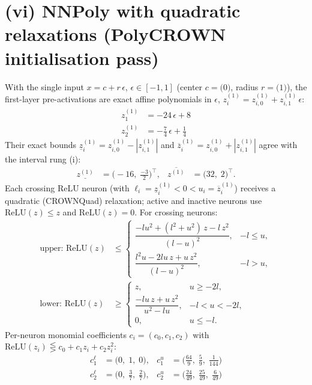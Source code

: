 \documentclass[11pt]{article}
\begin{document}
\section{(vi) NNPoly with quadratic relaxations (PolyCROWN initialisation pass)}
With the single input $x = c + r\,\epsilon$, $\epsilon \in [-1, 1]$ (center $c = \bigl(0\bigr)$, radius $r = \bigl(1\bigr)$), the first-layer pre-activations are exact affine polynomials in $\epsilon$, $z^{(1)}_i = z^{(1)}_{i,0} + z^{(1)}_{i,1}\,\epsilon$:
\begin{align*}
z^{(1)}_{1} &= -24\,\epsilon + 8 \\
z^{(1)}_{2} &= -\frac{7}{4}\,\epsilon + \frac{1}{4}
\end{align*}
Their exact bounds $\underline{z}^{(1)}_i = z^{(1)}_{i,0} - |z^{(1)}_{i,1}|$ and $\overline{z}^{(1)}_i = z^{(1)}_{i,0} + |z^{(1)}_{i,1}|$ agree with the interval rung (i):
\begin{align*}
\underline{z^{(1)}} &= \bigl(-16,\; \frac{-3}{2}\bigr)^{\!\top}, & \overline{z^{(1)}} &= \bigl(32,\; 2\bigr)^{\!\top}.
\end{align*}
Each crossing ReLU neuron (with $\ell_i = \underline{z}^{(1)}_i < 0 < u_i = \overline{z}^{(1)}_i$)
receives a quadratic (CROWNQuad) relaxation; active and inactive neurons use $\mathrm{ReLU}(z) \le z$
and $\mathrm{ReLU}(z) = 0$. For crossing neurons:
\begin{align*}
\text{upper: } \mathrm{ReLU}(z) &\le \begin{cases} \dfrac{-l u^2 + (l^2 + u^2)\, z - l\, z^2}{(l - u)^2}, & -l \le u, \\[3mm] \dfrac{l^2 u - 2 l u\, z + u\, z^2}{(l - u)^2}, & -l > u, \end{cases} \\[2mm]
\text{lower: } \mathrm{ReLU}(z) &\ge \begin{cases} z, & u \ge -2l, \\[3mm] \dfrac{-l u\, z + u\, z^2}{u^2 - l u}, & -l < u < -2l, \\[3mm] 0, & u \le -l. \end{cases}
\end{align*}
Per-neuron monomial coefficients $c_i = (c_0, c_1, c_2)$ with $\mathrm{ReLU}(z_i) \lesseqgtr c_0 + c_1 z_i + c_2 z_i^2$:
\begin{align*}
c^{\ell}_{1} &= \bigl(0,\; 1,\; 0\bigr), & c^{u}_{1} &= \bigl(\frac{64}{9},\; \frac{5}{9},\; \frac{1}{144}\bigr) \\
c^{\ell}_{2} &= \bigl(0,\; \frac{3}{7},\; \frac{2}{7}\bigr), & c^{u}_{2} &= \bigl(\frac{24}{49},\; \frac{25}{49},\; \frac{6}{49}\bigr)
\end{align*}
\end{document}

